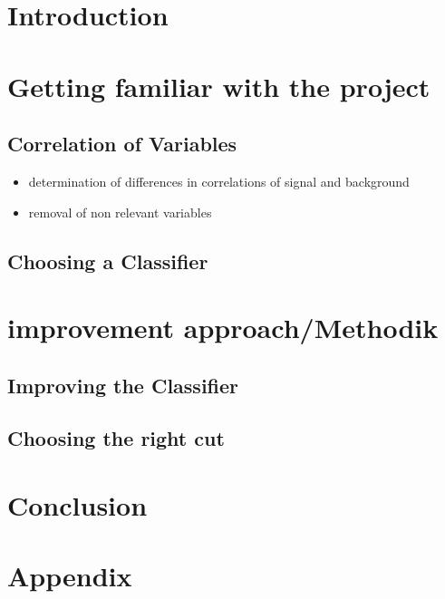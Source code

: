 \section{Introduction}
\cite{bibtex.a}
\section{Getting familiar with the project}
\subsection{Correlation of Variables}
\begin{itemize}
\item determination of differences in correlations of signal and background
\item removal of non relevant variables
\end{itemize}
\subsection{Choosing a Classifier}
\section{improvement approach/Methodik}
\subsection{Improving the Classifier}
\subsection{Choosing the right cut}

\section{Conclusion}
\section{Appendix}

